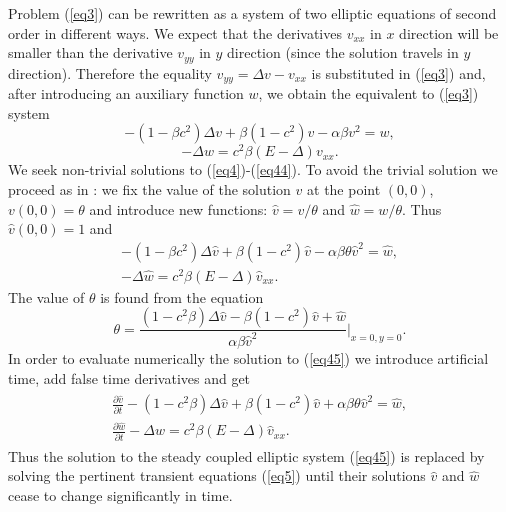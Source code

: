 \documentclass[leqno,11pt]{book}
\newcommand{\rf}[1]{(\ref{#1})}
\begin{document}
Problem \rf{eq3} can be rewritten  as a  system of two elliptic equations of second order in different ways. We expect that  the derivatives $v_{xx}$ in $x $ direction  will be smaller than the derivative $v_{yy}$ in $y$ direction (since the solution travels in $y$ direction). Therefore the equality $v_{yy} = \Delta v- v_{xx}$ is substituted in \rf{eq3} and, after  introducing an auxiliary  function $w$, we obtain the equivalent to \rf{eq3} system
\begin{equation}\label{eq4}
- (1-\beta c^2) \Delta v + \beta (1-c^2) v - \alpha \beta v^2 = w, 
\end{equation}
\begin{equation}\label{eq44}
 - \Delta w = c^2 \beta (E- \Delta) v_{xx}. 
\end{equation}
We  seek  non-trivial solutions to \rf{eq4}-\rf{eq44}. To avoid the trivial solution we proceed as in \cite{Ch2012}: we fix the value of the solution $v$ at the point $(0,0)$,    $v(0,0)=\theta $ and introduce  new  functions: $\widehat{v}=v/{\theta} $ and $\widehat{w}=w/{\theta} $. Thus  
$ \widehat{v}(0,0)=1$ and 
\begin{equation}\label{eq45}
\begin{split}
 - (1 - \beta c^2) \Delta \widehat{v} + \beta (1-c^2) \widehat{v} - \alpha \beta \theta \widehat{v}^2 = \widehat{w}, \\
 - \Delta \widehat{w} =  c^2 \beta (E- \Delta) \widehat{v}_{xx}.\;\;\;\; \;\;\;\;  \;\;\;\;  \;\;\;\; 
\end{split}
\end{equation}
The value of $\theta $ is found from the  equation 
\begin{equation}\label{eqtheta}
\theta = \frac{ (1-c^2 \beta) \Delta \widehat{v} - \beta (1-c^2) \widehat{v} +\widehat{w}}{\alpha \beta \widehat{v}^2 } |_{x=0,y=0} .
\end{equation}
In order to evaluate numerically the solution to \rf{eq45} we introduce artificial time, add false  time derivatives and  get
\begin{align}\label{eq5}
\begin{split}
 \frac {\partial \widehat{v}}{\partial t} - (1-c^2 \beta) \Delta \widehat{v} + \beta (1-c^2) \widehat{v} + \alpha \beta \theta \widehat{v}^2 = \widehat{w}, \\
 \frac {\partial \widehat{w}}{\partial t} - \Delta \widehat{w} =  c^2 \beta (E- \Delta) \widehat{v}_{xx}. \;\;\;\;  \;\;\;\;  \;\;\;\;  \;\;\;\;
\end{split}
\end{align}
Thus the solution to the steady coupled elliptic system \rf{eq45} is replaced by   solving the  pertinent transient equations \rf{eq5} until their solutions $\widehat{v}$ and $\widehat{w}$ cease to change significantly in time. 
\end{document}

